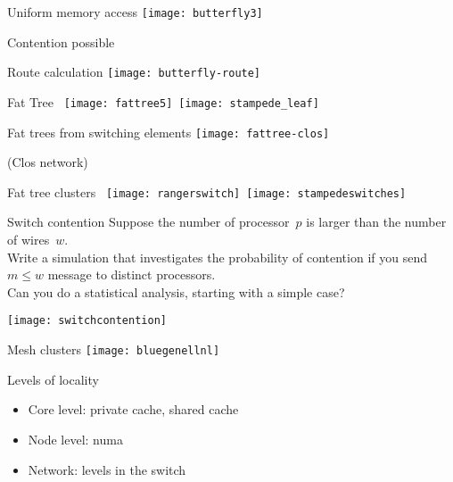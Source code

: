 \begin{numberedframe}{Uniform memory access}
  \texttt{[image: butterfly3]}
  
  Contention possible
\end{numberedframe}

\begin{numberedframe}{Route calculation}
  \texttt{[image: butterfly-route]}
\end{numberedframe}

\begin{numberedframe}{Fat Tree}
\hbox{%
  \texttt{[image: fattree5]}
  \kern20pt
  \texttt{[image: stampede\_leaf]}
}
\end{numberedframe}

\begin{numberedframe}{Fat trees from switching elements}
    \texttt{[image: fattree-clos]}

(Clos network)
\end{numberedframe}

\begin{numberedframe}{Fat tree clusters}
  \hbox{%
    \texttt{[image: rangerswitch]}\kern1cm
    \texttt{[image: stampedeswitches]}%
  }
\end{numberedframe}

\begin{exercise}{Switch contention}
  Suppose the number of processor~$p$ is larger than the number of wires~$w$.\\
  Write a simulation that investigates the probability of contention if you
  send $m\leq w$ message to distinct processors.\\
  Can you do a statistical analysis, starting with a simple case?

  \texttt{[image: switchcontention]}
\end{exercise}

\begin{numberedframe}{Mesh clusters}
  \texttt{[image: bluegenellnl]}
\end{numberedframe}
 
\begin{numberedframe}{Levels of locality}
  \begin{itemize}
  \item Core level: private cache, shared cache
  \item Node level: numa
  \item Network: levels in the switch
  \end{itemize}
\end{numberedframe}

